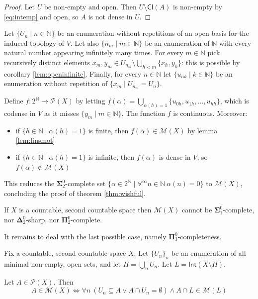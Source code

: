 \documentclass{lmcs}
\newcommand{\N}{\mathbb N}
\newcommand{\Can}{2^{\N}}
\newcommand{\bsigma}{\boldsymbol\Sigma}
\newcommand{\bpi}{\boldsymbol\Pi}
\newcommand{\bdelta}{\boldsymbol\Delta}
\newcommand{\Cl}[1]{\mathsf{Cl}(#1)}
\newcommand{\Int}[1]{\mathsf{Int}(#1)}
\begin{document}
\begin{proof}
Let $U$ be non-empty and open.
Then $U\setminus \Cl{A} $ is non-empty by \eqref{eq:intemp} and open, so $A$ is not dense in $U$.
\end{proof}

Let $\{ U_n\mid n\in \N \} $ be an enumeration without repetitions of an open basis for the induced topology of $V$.
Let also $\{ n_m\mid m\in \N \} $ be an enumeration of $ \N $ with every natural number appearing infinitely many times.
For every $m\in \N $ pick recursively distinct elements $x_m,y_m\in U_{n_m}\setminus\bigcup_{h<m}\{ x_h,y_h\} $: this is possible by corollary \ref{lem:openinfinite}.
Finally, for every $n\in \N $ let $\{ u_{nk}\mid k\in \N \} $ be an enumeration without repetition of $\{ x_m\mid U_{n_m}=U_n\} $.

Define $f: \Can \to \mathcal P (X)$ by letting $f(\alpha )=\bigcup_{\alpha (h)=1}\{ u_{0h},u_{1h},\ldots ,u_{hh}\} $, which is codense in $V$ as it misses $\{ y_m\mid m\in \N \} $.
The function $f$ is continuous.
Moreover:
\begin{itemize}
\item if $\{ h\in \N \mid\alpha (h)=1\} $ is finite, then $f(\alpha )\in \mathcal M (X)$ by lemma \ref{lem:finsmot}
\item if $\{ h\in \N \mid\alpha (h)=1\} $ is infinite, then $f(\alpha )$ is dense in $V$, so $f(\alpha )\notin \mathcal M (X)$
\end{itemize}

This reduces the $ \bsigma^0_2$-complete set $\{\alpha\in \Can \mid\forall^{\infty }n\in \N \ \alpha (n)=0\} $ to $ \mathcal M (X)$, concluding the proof of theorem \ref{thm:wishful}.

\begin{cor}
If $X$ is a countable, second countable space then $ \mathcal M (X)$ cannot be $ \bsigma^0_1$-complete, nor $ \bdelta^0_2$-sharp, nor $ \bpi^0_2$-complete.
\end{cor}

It remains to deal with the last possible case, namely $ \bpi^0_3$-completeness.

Fix a countable, second countable space $X$.
Let $\{ U_n\}_n$ be an enumeration of all minimal non-empty, open sets, and let $H=\bigcup_nU_n$.
Let $L= \Int{X\setminus H} $.

\begin{lem} \label{eq:conddec}
Let $A\in \mathcal P (X)$.
Then
\[
A\in\mathcal M (X)\Leftrightarrow\forall n\ (U_n\subseteq A\lor A\cap U_n=\emptyset )\land A\cap L\in \mathcal M (L)
\]
\end{lem}
\end{document}
